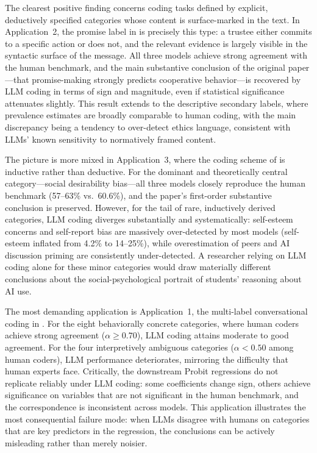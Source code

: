 \documentclass[11pt]{article}
\begin{document}
\begin{sloppypar}
The clearest positive finding concerns coding tasks defined by explicit, deductively specified categories whose content is surface-marked in the text. In Application~2, the promise label in \citet{ederer_schneider_2022} is precisely this type: a trustee either commits to a specific action or does not, and the relevant evidence is largely visible in the syntactic surface of the message. All three models achieve strong agreement with the human benchmark, and the main substantive conclusion of the original paper---that promise-making strongly predicts cooperative behavior---is recovered by LLM coding in terms of sign and magnitude, even if statistical significance attenuates slightly. This result extends to the descriptive secondary labels, where prevalence estimates are broadly comparable to human coding, with the main discrepancy being a tendency to over-detect ethics language, consistent with LLMs' known sensitivity to normatively framed content.

The picture is more mixed in Application~3, where the coding scheme of \citet{ling2025underreporting} is inductive rather than deductive. For the dominant and theoretically central category---social desirability bias---all three models closely reproduce the human benchmark (57--63\% vs.\ 60.6\%), and the paper's first-order substantive conclusion is preserved. However, for the tail of rare, inductively derived categories, LLM coding diverges substantially and systematically: self-esteem concerns and self-report bias are massively over-detected by most models (self-esteem inflated from 4.2\% to 14--25\%), while overestimation of peers and AI discussion priming are consistently under-detected. A researcher relying on LLM coding alone for these minor categories would draw materially different conclusions about the social-psychological portrait of students' reasoning about AI use.

The most demanding application is Application~1, the multi-label conversational coding in \citet{brandts_cooper_2025}. For the eight behaviorally concrete categories, where human coders achieve strong agreement ($\alpha \geq 0.70$), LLM coding attains moderate to good agreement. For the four interpretively ambiguous categories ($\alpha < 0.50$ among human coders), LLM performance deteriorates, mirroring the difficulty that human experts face. Critically, the downstream Probit regressions do not replicate reliably under LLM coding: some coefficients change sign, others achieve significance on variables that are not significant in the human benchmark, and the correspondence is inconsistent across models. This application illustrates the most consequential failure mode: when LLMs disagree with humans on categories that are key predictors in the regression, the conclusions can be actively misleading rather than merely noisier.


\end{sloppypar}
\end{document}
